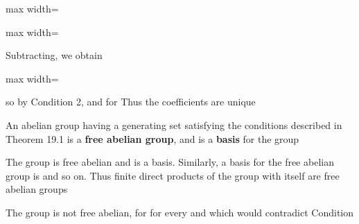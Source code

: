 \documentclass[11pt,oneside]{article}
\begin{document}
\BookNarrativetrue

\begin{BookBody}

\begin{center}\begin{adjustbox}{max width=\linewidth}\end{adjustbox}\end{center}

\begin{center}\begin{adjustbox}{max width=\linewidth}\end{adjustbox}\end{center}

\noindent Subtracting, we obtain

\begin{center}\begin{adjustbox}{max width=\linewidth}\end{adjustbox}\end{center}

\noindent so  by Condition 2, and  for  Thus the coefficients are unique\BookEnd{\blacklozenge}

 An abelian group having a generating set  satisfying the conditions described in Theorem 19.1 is a\textbf{ free abelian group}, and  is a\textbf{ basis} for the group\BookEnd{\blacksquare}

 The group  is free abelian and  is a basis. Similarly, a basis for the free abelian group  is  and so on. Thus finite direct products of the group  with itself are free abelian groups\BookEnd{\blacktriangle}

 The group  is not free abelian, for  for every  and  which would contradict Condition \BookEnd{\blacktriangle}


\end{BookBody}
\end{document}
